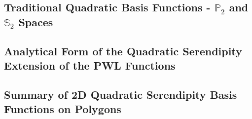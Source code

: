 \subsection{Traditional Quadratic Basis Functions - $\mathbb{P}_{2}$ and $\mathbb{S}_{2}$ Spaces}
\label{sec::BF_2DQuadratic_P2S2}


\subsection{Analytical Form of the Quadratic Serendipity Extension of the PWL Functions}
\label{sec::BF_2DQuadratic_PWQ}



\subsection{Summary of 2D Quadratic Serendipity Basis Functions on Polygons}
\label{sec::BF_2DQuadratic_Summary}


